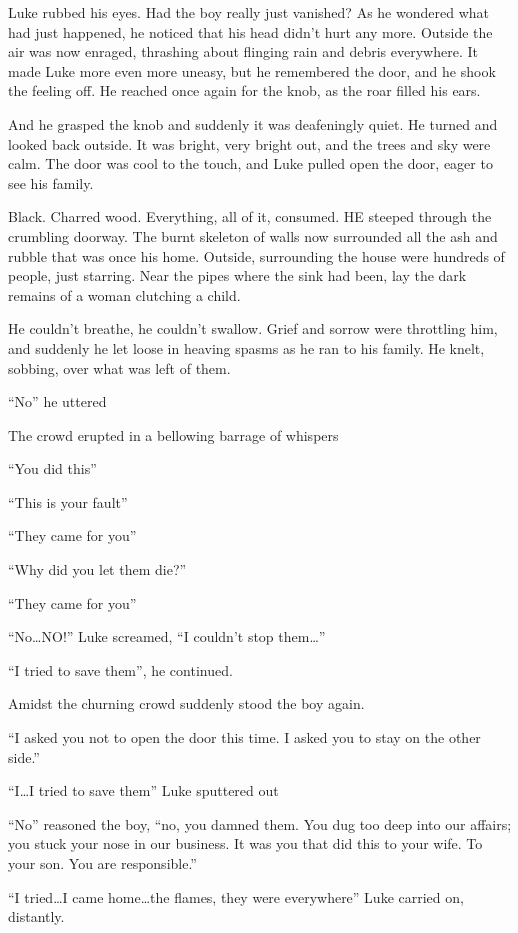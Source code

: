 Luke rubbed his eyes. Had the boy really just vanished? As he
wondered what had just happened, he noticed that his head
didn't hurt any more. Outside the air was now enraged,
thrashing about flinging rain and debris everywhere. It made Luke
more even more uneasy, but he remembered the door, and he shook the
feeling off. He reached once again for the knob, as the roar filled
his ears.

And he grasped the knob and suddenly it was deafeningly quiet. He
turned and looked back outside. It was bright, very bright out, and
the trees and sky were calm. The door was cool to the touch, and
Luke pulled open the door, eager to see his family.

Black. Charred wood. Everything, all of it, consumed. HE steeped
through the crumbling doorway. The burnt skeleton of walls now
surrounded all the ash and rubble that was once his home. Outside,
surrounding the house were hundreds of people, just starring. Near
the pipes where the sink had been, lay the dark remains of a woman
clutching a child.

He couldn't breathe, he couldn't swallow. Grief and
sorrow were throttling him, and suddenly he let loose in heaving
spasms as he ran to his family. He knelt, sobbing, over what was
left of them.

``No'' he uttered

The crowd erupted in a bellowing barrage of whispers

``You did this''

``This is your fault''

``They came for you''

``Why did you let them die?''

``They came for you''

``No{\ldots}NO!'' Luke screamed, ``I couldn't
stop them{\ldots}''

``I tried to save them'', he continued.

Amidst the churning crowd suddenly stood the boy again.

``I asked you not to open the door this time. I asked you to
stay on the other side.''

``I{\ldots}I tried to save them'' Luke sputtered
out

``No'' reasoned the boy, ``no, you damned them. You
dug too deep into our affairs; you stuck your nose in our business.
It was you that did this to your wife. To your son. You are
responsible.''

``I tried{\ldots}I came home{\ldots}the flames, they were
everywhere'' Luke carried on, distantly.

